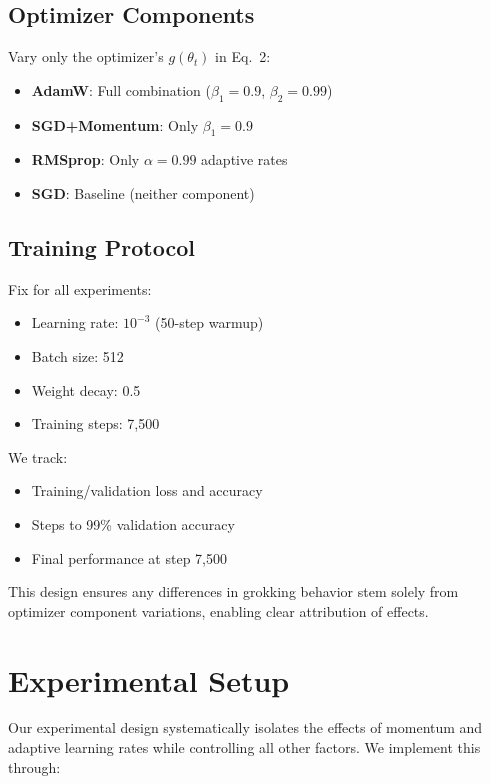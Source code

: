 \documentclass{article} %
\begin{document}
\subsection{Optimizer Components}
Vary only the optimizer's $g(\theta_t)$ in Eq.~2:
\begin{itemize}
    \item \textbf{AdamW}: Full combination ($\beta_1=0.9$, $\beta_2=0.99$)
    \item \textbf{SGD+Momentum}: Only $\beta_1=0.9$ 
    \item \textbf{RMSprop}: Only $\alpha=0.99$ adaptive rates
    \item \textbf{SGD}: Baseline (neither component)
\end{itemize}

\subsection{Training Protocol}
Fix for all experiments:
\begin{itemize}
    \item Learning rate: $10^{-3}$ (50-step warmup)
    \item Batch size: 512
    \item Weight decay: 0.5
    \item Training steps: 7,500
\end{itemize}

We track:
\begin{itemize}
    \item Training/validation loss and accuracy
    \item Steps to 99\% validation accuracy
    \item Final performance at step 7,500
\end{itemize}

This design ensures any differences in grokking behavior stem solely from optimizer component variations, enabling clear attribution of effects.

\section{Experimental Setup}
\label{sec:experimental}

Our experimental design systematically isolates the effects of momentum and adaptive learning rates while controlling all other factors. We implement this through:
\end{document}
